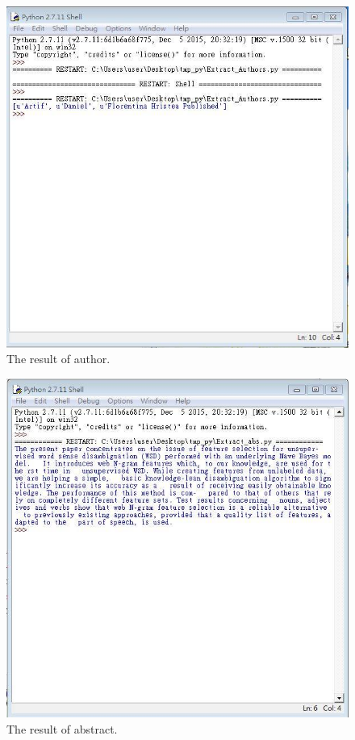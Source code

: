 	\begin{figure}[tbh]
		\begin{center}
			\includegraphics[width=\columnwidth]{Union_Result_Chart_Author}
		\end{center}
		\caption{The result of author.}
	\end{figure}
	
	\begin{figure}[tbh]
		\begin{center}
			\includegraphics[width=\columnwidth]{Union_Result_Chart_Abstract}
		\end{center}
		\caption{The result of abstract.}
	\end{figure}
	
